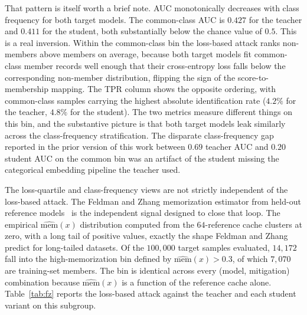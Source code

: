 \documentclass[conference]{IEEEtran}
\begin{document}
That pattern is itself worth a brief note. AUC monotonically decreases with class frequency for both target models. The common-class AUC is $0.427$ for the teacher and $0.411$ for the student, both substantially below the chance value of $0.5$. This is a real inversion. Within the common-class bin the loss-based attack ranks non-members above members on average, because both target models fit common-class member records well enough that their cross-entropy loss falls below the corresponding non-member distribution, flipping the sign of the score-to-membership mapping. The TPR column shows the opposite ordering, with common-class samples carrying the highest absolute identification rate ($4.2\%$ for the teacher, $4.8\%$ for the student). The two metrics measure different things on this bin, and the substantive picture is that both target models leak similarly across the class-frequency stratification. The disparate class-frequency gap reported in the prior version of this work between $0.69$ teacher AUC and $0.20$ student AUC on the common bin was an artifact of the student missing the categorical embedding pipeline the teacher used.

The loss-quartile and class-frequency views are not strictly independent of the loss-based attack. The Feldman and Zhang memorization estimator from held-out reference models~\cite{feldman2020} is the independent signal designed to close that loop. The empirical $\widehat{\mathrm{mem}}(x)$ distribution computed from the $64$-reference cache clusters at zero, with a long tail of positive values, exactly the shape Feldman and Zhang predict for long-tailed datasets. Of the $100{,}000$ target samples evaluated, $14{,}172$ fall into the high-memorization bin defined by $\widehat{\mathrm{mem}}(x) > 0.3$, of which $7{,}070$ are training-set members. The bin is identical across every (model, mitigation) combination because $\widehat{\mathrm{mem}}(x)$ is a function of the reference cache alone. Table~\ref{tab:fz} reports the loss-based attack against the teacher and each student variant on this subgroup.
\end{document}
